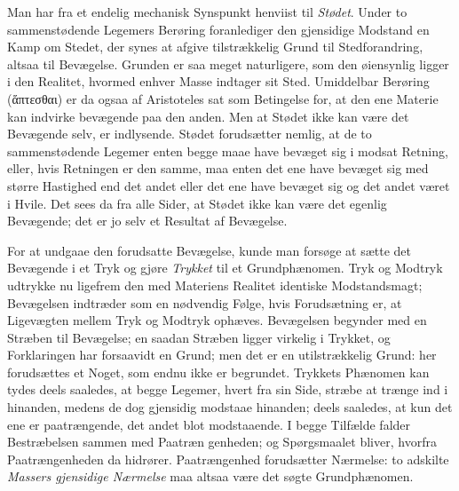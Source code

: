 \documentclass[12pt,a4paper]{book}
\begin{document}
Man har fra et endelig mechanisk Synspunkt henviist til
\emph{Stødet}. Under to sammenstødende Legemers Berøring foranlediger
den gjensidige Modstand en Kamp om Stedet, der synes at afgive
tilstrækkelig Grund til Stedforandring, altsaa til Bevægelse. Grunden
er saa meget naturligere, som den øiensynlig ligger i den Realitet,
hvormed enhver Masse indtager sit Sted. Umiddelbar Berøring
(ἅπτεσθαι) er da ogsaa af Aristoteles sat som Betingelse for, at den
ene Materie kan indvirke bevægende paa den anden. Men at Stødet ikke
kan være det Bevægende selv, er indlysende. Stødet forudsætter nemlig,
at de to sammenstødende Legemer enten begge maae have bevæget sig i
modsat Retning, eller, hvis Retningen er den samme, maa enten det ene
have bevæget sig med større Hastighed end det andet eller det ene have
bevæget sig og det andet været i Hvile. Det sees da fra alle Sider, at
Stødet ikke kan være det egenlig Bevægende; det er jo selv et Resultat
af Bevægelse.

For at undgaae den forudsatte Bevægelse, kunde man forsøge at sætte det
Bevægende i et Tryk og gjøre \emph{Trykket} til et Grundphænomen. Tryk
og Modtryk udtrykke nu ligefrem den med Materiens Realitet identiske
Modstandsmagt; Bevægelsen indtræder som en nødvendig Følge, hvis
Forudsætning er, at Ligevægten mellem Tryk og Modtryk ophæves.
Bevægelsen begynder med en Stræben til Bevægelse; en saadan Stræben
ligger virkelig i Trykket, og Forklaringen har forsaavidt en Grund; men
det er en utilstrækkelig Grund: her forudsættes et Noget, som endnu
ikke er begrundet. Trykkets Phænomen kan tydes deels saaledes, at
begge Legemer, hvert fra sin Side, stræbe at trænge ind i hinanden,
medens de dog gjensidig modstaae hinanden; deels saaledes, at kun det
ene er paatrængende, det andet blot modstaaende. I begge Tilfælde
falder Bestræbelsen sammen med Paatræn\-%
genheden; og Spørgsmaalet bliver, hvorfra Paatrængenheden da hidrører.
Paatrængenhed forudsætter Nærmelse: to adskilte \emph{Massers
gjensidige Nærmelse} maa altsaa være det søgte Grundphænomen.
\end{document}
